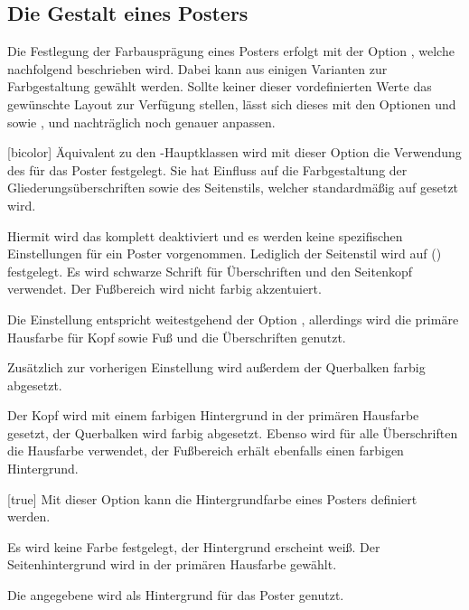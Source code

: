\begin{Bundle*}[v2.05]{}
\subsection{Die Gestalt eines Posters}

Die Festlegung der Farbausprägung eines Posters erfolgt mit der Option 
, welche nachfolgend beschrieben wird. Dabei kann aus einigen 
Varianten zur Farbgestaltung gewählt werden. Sollte keiner dieser 
vordefinierten Werte das gewünschte Layout zur Verfügung stellen, lässt sich 
dieses mit den Optionen  und  sowie 
,  und  nachträglich 
noch genauer anpassen.


\begin{Declaration}{}[bicolor]
\printdeclarationlist%
%
Äquivalent zu den \TUDScript-Hauptklassen wird mit dieser Option die Verwendung 
des \TUDCDs für das Poster festgelegt. Sie hat Einfluss auf die Farbgestaltung 
der Gliederungsüberschriften sowie des Seitenstils, welcher standardmäßig auf 
 gesetzt wird.
%
\begin{values}{}
\itemfalse
  Hiermit wird das \CD komplett deaktiviert und es werden keine spezifischen 
  Einstellungen für ein Poster vorgenommen. Lediglich der Seitenstil wird auf 
  () festgelegt.
  Es wird schwarze Schrift für Überschriften und den Seitenkopf verwendet. Der 
  Fußbereich wird nicht farbig akzentuiert.
\item[lightcolor/pale]
  Die Einstellung entspricht weitestgehend der Option , 
  allerdings wird die primäre Hausfarbe  für Kopf sowie Fuß und 
  die Überschriften genutzt.
\item[barcolor]
  Zusätzlich zur vorherigen Einstellung wird außerdem der Querbalken farbig 
  abgesetzt.
\item[bicolor/color/fullcolor]
  Der Kopf wird mit einem farbigen Hintergrund in der primären Hausfarbe 
   gesetzt, der Querbalken wird farbig abgesetzt. Ebenso wird für 
  alle Überschriften die Hausfarbe verwendet, der Fußbereich erhält ebenfalls 
  einen farbigen Hintergrund.
\end{values}
\end{Declaration}

\begin{Declaration}{}[true]
\printdeclarationlist%
%
Mit dieser Option kann die Hintergrundfarbe eines Posters definiert werden.
%
\begin{values}{}
\itemfalse[nocolor]
  Es wird keine Farbe festgelegt, der Hintergrund erscheint weiß.
\itemtrue*[color]
  Der Seitenhintergrund wird in der primären Hausfarbe  gewählt.
\item[\PValueName{Farbe}]
  Die angegebene  wird als Hintergrund für das Poster genutzt.
\end{values}
\end{Declaration}


\end{Bundle*}
